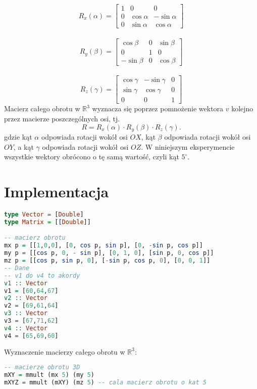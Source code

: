 \begin{equation*}
R_{x}(\alpha) =
    \begin{bmatrix}
    1 & 0 & 0 \\
    0 & \cos\alpha & -\sin\alpha \\
    0 & \sin\alpha & \cos\alpha 
    \end{bmatrix}
    \end{equation*}
    \\
    \begin{equation*}
    R_{y}(\beta) =
    \begin{bmatrix}
    \cos\beta & 0 & \sin\beta \\
    0 & 1 & 0  \\
    -\sin\beta & 0 & \cos\beta
    \end{bmatrix}
    \end{equation*}
    \\
    \begin{equation*}
        R_{z}(\gamma) =
        \begin{bmatrix}
        \cos\gamma & -\sin\gamma & 0 \\
        \sin\gamma & \cos\gamma  & 0 \\
        0 & 0 & 1
        \end{bmatrix}
    \end{equation*}
    Macierz całego obrotu w $\mathbb{R}^{3}$ wyznacza się poprzez pomnożenie wektora $v$ kolejno przez macierze poszczególnych osi, tj.
    \begin{equation*}
        R = R_{x}(\alpha) \cdot R_{y}(\beta) \cdot R_{z}(\gamma).
    \end{equation*}
gdzie kąt $\alpha$ odpowiada rotacji wokół osi $OX$, kąt $\beta$ odpowiada rotacji wokół osi $OY$, a kąt $\gamma$ odpowiada rotacji wokół osi $OZ$. W niniejszym eksperymencie wszystkie wektory obrócono o tę samą wartość, czyli kąt $5^{\circ}$.

\section{Implementacja}
\begin{lstlisting}[language = Haskell]
type Vector = [Double]
type Matrix = [[Double]]

-- macierz obrotu
mx p = [[1,0,0], [0, cos p, sin p], [0, -sin p, cos p]]
my p = [[cos p, 0, - sin p], [0, 1, 0], [sin p, 0, cos p]]
mz p = [[cos p, sin p, 0], [-sin p, cos p, 0], [0, 0, 1]]
-- Dane
-- v1 do v4 to akordy
v1 :: Vector
v1 = [60,64,67]
v2 :: Vector
v2 = [69,61,64]
v3 :: Vector
v3 = [67,71,62]
v4 :: Vector
v4 = [65,69,60]
\end{lstlisting}
Wyznaczenie macierzy całego obrotu w $\mathbb{R}^{3}$:
\begin{lstlisting}[language = Haskell]
-- macierze obrotu 3D
mXY = mmult (mx 5) (my 5) 
mXYZ = mmult (mXY) (mz 5) -- cala macierz obrotu o kat 5
\end{lstlisting}

